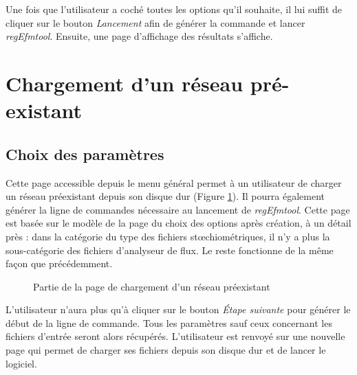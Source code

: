 Une fois que l'utilisateur a coché toutes les options qu'il souhaite, il lui suffit de cliquer sur le bouton \emph{Lancement} afin de générer la commande et lancer \textit{regEfmtool}. Ensuite, une page d'affichage des résultats s'affiche. 

\section{Chargement d'un réseau pré-existant}

\subsection{Choix des paramètres}
Cette page accessible depuis le menu général permet à un utilisateur de charger un réseau préexistant depuis son disque dur (Figure \ref{chargement1}). Il pourra également générer la ligne de commandes nécessaire au lancement de \textit{regEfmtool}. Cette page est basée sur le modèle de la page du choix des options après création, à un détail près : dans la catégorie du type des fichiers stœchiométriques, il n'y a plus la sous-catégorie des fichiers d'analyseur de flux. Le reste fonctionne de la m\^eme façon que précédemment. \\

\begin{figure}[!ht]
	\begin{center}
		\caption{Partie de la page de chargement d'un réseau préexistant}
  		\label{chargement1}
  	\end{center}	
\end{figure}

L'utilisateur n'aura plus qu'à cliquer sur le bouton \textit{Étape suivante} pour générer le début de la ligne de commande. Tous les paramètres sauf ceux concernant les fichiers d'entrée seront alors récupérés. L'utilisateur est renvoyé sur une nouvelle page qui permet de charger ses fichiers depuis son disque dur et de lancer le logiciel. 

